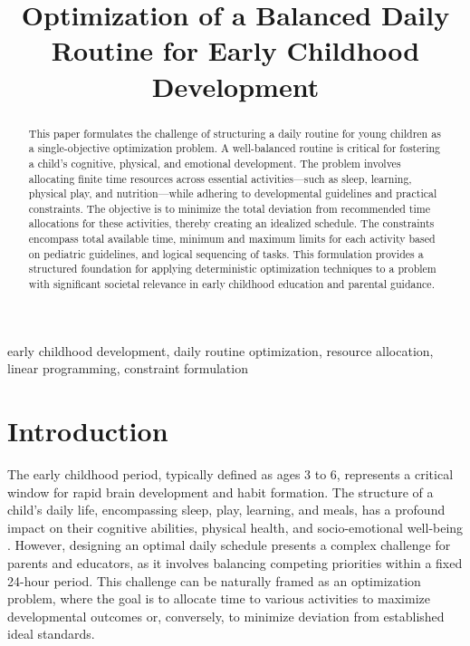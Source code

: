 \documentclass[10pt,conference,compsocconf]{IEEEtran}
\begin{document}
\title{Optimization of a Balanced Daily Routine for Early Childhood Development}

\author{
}

\maketitle

\begin{abstract}
This paper formulates the challenge of structuring a daily routine for young children as a single-objective optimization problem. A well-balanced routine is critical for fostering a child's cognitive, physical, and emotional development. The problem involves allocating finite time resources across essential activities—such as sleep, learning, physical play, and nutrition—while adhering to developmental guidelines and practical constraints. The objective is to minimize the total deviation from recommended time allocations for these activities, thereby creating an idealized schedule. The constraints encompass total available time, minimum and maximum limits for each activity based on pediatric guidelines, and logical sequencing of tasks. This formulation provides a structured foundation for applying deterministic optimization techniques to a problem with significant societal relevance in early childhood education and parental guidance.
\end{abstract}

\begin{IEEEkeywords}
early childhood development, daily routine optimization, resource allocation, linear programming, constraint formulation
\end{IEEEkeywords}

\section{Introduction}

The early childhood period, typically defined as ages 3 to 6, represents a critical window for rapid brain development and habit formation. The structure of a child's daily life, encompassing sleep, play, learning, and meals, has a profound impact on their cognitive abilities, physical health, and socio-emotional well-being \cite{aber1997effects}. However, designing an optimal daily schedule presents a complex challenge for parents and educators, as it involves balancing competing priorities within a fixed 24-hour period. This challenge can be naturally framed as an optimization problem, where the goal is to allocate time to various activities to maximize developmental outcomes or, conversely, to minimize deviation from established ideal standards.
\end{document}
